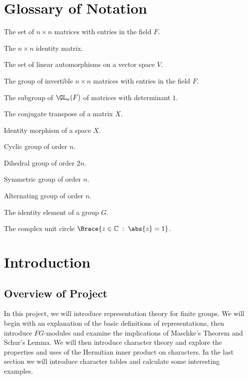 \newpage
\thispagestyle{empty}
\tableofcontents



\newpage
\section*{Glossary of Notation}
\thispagestyle{empty}
	\begin{mitem}
		\item{ The set of $n\times n$ matrices with entries in the field $F$.}
		\item{ The $n\times n$ identity matrix.}
		\item { The set of linear automorphisms on a vector space $V$.}
		\item { The group of invertible $n\times n$ matrices with entries in the field $F$.}
		\item { The subgroup of $\GL_n(F)$ of matrices with determinant $1$.}
		\item { The conjugate transpose of a matrix $X$.}
		\item { Identity morphism of a space $X$.}
		\item { Cyclic group of order $n$.}
		\item { Dihedral group of order $2n$.}
		\item { Symmetric group of order $n$.}
		\item { Alternating group of order $n$.}
		\item { The identity element of a group $G$.}
		\item { The complex unit circle $\Brace{z \in \mathbb{C}\;:\;\abs{z} = 1}$.}
	\end{mitem}

\newpage
\setcounter{page}{1}
\section{Introduction}
\subsection{Overview of Project}
In this project, we will introduce representation theory for finite groups. We will begin with an explanation of the basic definitions of representations, then introduce $FG$-modules and examine the implications of Maschke's Theorem and Schur's Lemma. We will then introduce character theory and explore the properties and uses of the Hermitian inner product on characters. In the last section we will introduce character tables and calculate some interesting examples.\\

